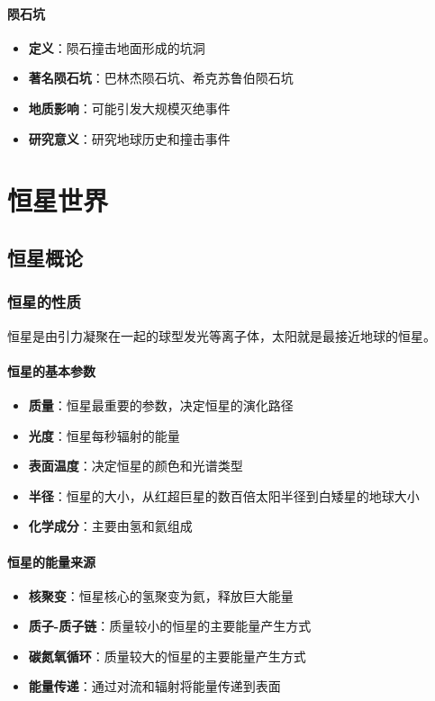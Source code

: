 \documentclass[12pt,UTF8]{ctexbook}
\begin{document}
\subsection{陨石坑}

\begin{itemize}
  \item \textbf{定义}：陨石撞击地面形成的坑洞
  \item \textbf{著名陨石坑}：巴林杰陨石坑、希克苏鲁伯陨石坑
  \item \textbf{地质影响}：可能引发大规模灭绝事件
  \item \textbf{研究意义}：研究地球历史和撞击事件
\end{itemize}

\part{恒星世界}

\chapter{恒星概论}
\section{恒星的性质}

恒星是由引力凝聚在一起的球型发光等离子体，太阳就是最接近地球的恒星。

\subsection{恒星的基本参数}

\begin{itemize}
  \item \textbf{质量}：恒星最重要的参数，决定恒星的演化路径
  \item \textbf{光度}：恒星每秒辐射的能量
  \item \textbf{表面温度}：决定恒星的颜色和光谱类型
  \item \textbf{半径}：恒星的大小，从红超巨星的数百倍太阳半径到白矮星的地球大小
  \item \textbf{化学成分}：主要由氢和氦组成
\end{itemize}

\subsection{恒星的能量来源}

\begin{itemize}
  \item \textbf{核聚变}：恒星核心的氢聚变为氦，释放巨大能量
  \item \textbf{质子-质子链}：质量较小的恒星的主要能量产生方式
  \item \textbf{碳氮氧循环}：质量较大的恒星的主要能量产生方式
  \item \textbf{能量传递}：通过对流和辐射将能量传递到表面
\end{itemize}
\end{document}
